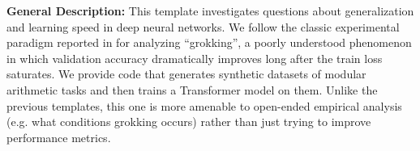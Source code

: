 \documentclass[11pt, a4paper]{include/gdm_format}
\begin{document}
\begin{table}[!h]
\centering
\caption{\textbf{Evaluation of automated AI Scientist paper generation for Grokking.}}
\label{tab:grokking_papers}
%
\end{table}

\textbf{General Description:} This template investigates questions about generalization and learning speed in deep neural networks.
We follow the classic experimental paradigm reported in \citet{power2022grokking} for analyzing ``grokking'', a poorly understood phenomenon in which validation accuracy dramatically improves long after the train loss saturates.
We provide code that generates synthetic datasets of modular arithmetic tasks and then trains a Transformer model on them.
Unlike the previous templates, this one is more amenable to open-ended empirical analysis (e.g. what conditions grokking occurs) rather than just trying to improve performance metrics.
\end{document}
